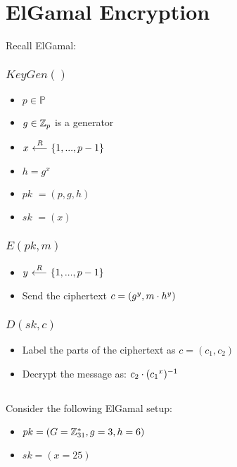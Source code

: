 \documentclass[12pt]{article}
\begin{document}
 


\section{ElGamal Encryption}

Recall ElGamal:


\subsubsection*{$KeyGen()$}


\begin{itemize}
\item $p \in \mathbb{P}$
\item $g \in \mathbb{Z}_p$ is a generator
\item $x {\ \overset{R}\longleftarrow\ } \{1, ..., p-1\}$
\item $h = g^x$
\item $pk$ $= (p, g, h)$
\item $sk$ $= (x)$
\end{itemize}

\subsubsection*{$E(pk, m)$}


\begin{itemize}
\item $y {\ \overset{R}\longleftarrow\ } \{1, ..., p-1\}$
\item Send the ciphertext $c = (g^y, m \cdot h^y)$
\end{itemize}

\subsubsection*{$D(sk, c)$}


\begin{itemize}
\item Label the parts of the ciphertext as $c = (c_1, c_2)$
\item Decrypt the message as: $c_2 \cdot ({c_1}^x)^{-1}$
\end{itemize}


\subsection{}


Consider the following ElGamal setup:

\begin{itemize}
\item $pk = (G = \mathbb{Z}_{31}^*, g = 3, h = 6)$
\item $sk = (x = 25)$
\end{itemize}
\end{document}
